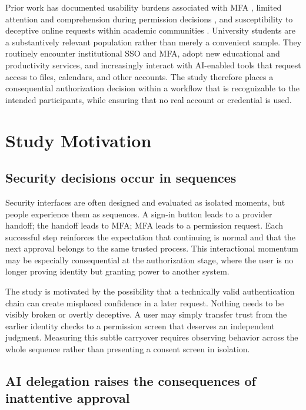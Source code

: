 \documentclass[11pt]{article}
\begin{document}
Prior work has documented usability burdens associated with MFA
\cite{reese2019usability}, limited attention and comprehension during
permission decisions \cite{felt2012android}, and susceptibility to deceptive online requests
within academic communities \cite{diaz2020,sheng2010}. University students are
a substantively relevant population rather than merely a convenient sample.
They routinely encounter institutional SSO and MFA, adopt new educational and
productivity services, and increasingly interact with AI-enabled tools that
request access to files, calendars, and other accounts. The study therefore
places a consequential authorization decision within a workflow that is
recognizable to the intended participants, while ensuring that no real account
or credential is used.

\section{Study Motivation}

\subsection{Security decisions occur in sequences}

Security interfaces are often designed and evaluated as isolated moments, but
people experience them as sequences. A sign-in button leads to a provider
handoff; the handoff leads to MFA; MFA leads to a permission request. Each
successful step reinforces the expectation that continuing is normal and that
the next approval belongs to the same trusted process. This interactional
momentum may be especially consequential at the authorization stage, where the
user is no longer proving identity but granting power to another system.

The study is motivated by the possibility that a technically valid
authentication chain can create misplaced confidence in a later request.
Nothing needs to be visibly broken or overtly deceptive. A user may simply
transfer trust from the earlier identity checks to a permission screen that
deserves an independent judgment. Measuring this subtle carryover requires
observing behavior across the whole sequence rather than presenting a consent
screen in isolation.

\subsection{AI delegation raises the consequences of inattentive approval}
\end{document}
